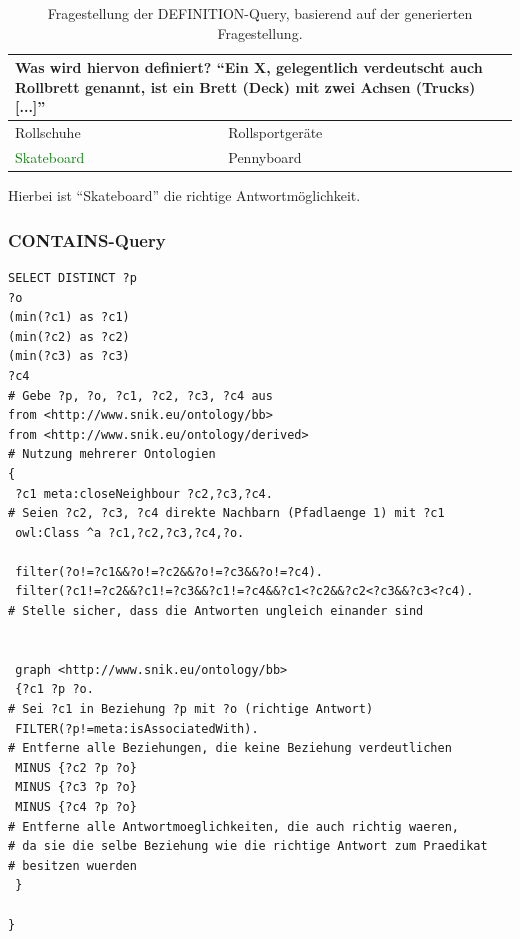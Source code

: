 \documentclass[headsepline,titlepage,ngerman,twoside,12pt]{report}
\begin{document}
\begin{table}
\begin{centering}
\begin{tabularx}{\textwidth}{XXX}
\toprule
\multicolumn{2}{p{0.97\textwidth}}{Was wird hiervon definiert? \enquote{Ein X, gelegentlich verdeutscht auch Rollbrett genannt, ist ein Brett (Deck) mit zwei Achsen (Trucks) [...]}}\\
\midrule
Rollschuhe										&Rollsportgeräte\\
\textcolor{green}{Skateboard}			&Pennyboard\\
\bottomrule
\end{tabularx}
\end{centering}
\caption{Fragestellung der DEFINITION-Query, basierend auf der generierten Fragestellung.}
\label{tab:sparqldefinitionexample}
\end{table}

Hierbei ist \enquote{Skateboard} die richtige Antwortmöglichkeit. 

\subsubsection{CONTAINS-Query}
\begin{lstlisting}
SELECT DISTINCT ?p
?o
(min(?c1) as ?c1)
(min(?c2) as ?c2)
(min(?c3) as ?c3)
?c4
# Gebe ?p, ?o, ?c1, ?c2, ?c3, ?c4 aus
from <http://www.snik.eu/ontology/bb>
from <http://www.snik.eu/ontology/derived>
# Nutzung mehrerer Ontologien
{
 ?c1 meta:closeNeighbour ?c2,?c3,?c4. 
# Seien ?c2, ?c3, ?c4 direkte Nachbarn (Pfadlaenge 1) mit ?c1
 owl:Class ^a ?c1,?c2,?c3,?c4,?o.

 filter(?o!=?c1&&?o!=?c2&&?o!=?c3&&?o!=?c4).
 filter(?c1!=?c2&&?c1!=?c3&&?c1!=?c4&&?c1<?c2&&?c2<?c3&&?c3<?c4).
# Stelle sicher, dass die Antworten ungleich einander sind


 graph <http://www.snik.eu/ontology/bb>
 {?c1 ?p ?o.
# Sei ?c1 in Beziehung ?p mit ?o (richtige Antwort)
 FILTER(?p!=meta:isAssociatedWith).
# Entferne alle Beziehungen, die keine Beziehung verdeutlichen
 MINUS {?c2 ?p ?o} 
 MINUS {?c3 ?p ?o} 
 MINUS {?c4 ?p ?o} 
# Entferne alle Antwortmoeglichkeiten, die auch richtig waeren,
# da sie die selbe Beziehung wie die richtige Antwort zum Praedikat
# besitzen wuerden
 }
 
}
\end{lstlisting}
\end{document}
